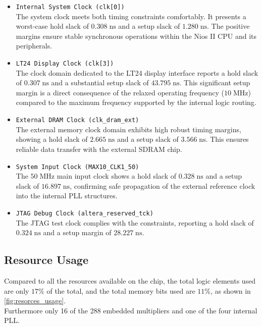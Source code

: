 \begin{itemize}
    \item \texttt{Internal System Clock (clk[0])} \\
    The system clock meets both timing constraints comfortably. It presents a worst-case hold slack of $0.308 \; \text{ns}$ and a setup slack of $1.280 \; \text{ns}$. The positive margins ensure stable synchronous operations within the Nios II CPU and its peripherals.

    \item \texttt{LT24 Display Clock (clk[3])} \\
    The clock domain dedicated to the LT24 display interface reports a hold slack of $0.307 \; \text{ns}$ and a substantial setup slack of $43.795 \; \text{ns}$. This significant setup margin is a direct consequence of the relaxed operating frequency ($10 \; \text{MHz}$) compared to the maximum frequency supported by the internal logic routing.

    \item \texttt{External DRAM Clock (clk\_dram\_ext)} \\
    The external memory clock domain exhibits high robust timing margins, showing a hold slack of $2.665 \; \text{ns}$ and a setup slack of $3.566 \; \text{ns}$. This ensures reliable data transfer with the external SDRAM chip.

    \item \texttt{System Input Clock (MAX10\_CLK1\_50)} \\
    The $50 \; \text{MHz}$ main input clock shows a hold slack of $0.328 \; \text{ns}$ and a setup slack of $16.897 \; \text{ns}$, confirming safe propagation of the external reference clock into the internal PLL structures.

    \item \texttt{JTAG Debug Clock (altera\_reserved\_tck)} \\
    The JTAG test clock complies with the constraints, reporting a hold slack of $0.324 \; \text{ns}$ and a setup margin of $28.227 \; \text{ns}$.
\end{itemize}

\newpage
\subsection{Resource Usage}
\label{sssec:hw_footprint_chpl}

Compared to all the resources available on the chip, the total logic elements used are only \(17\%\) of the total, and the total memory bits used are \(11\%\), as shown in \autoref{fig:resorces_usage}. \\
Furthermore only 16 of the 288 embedded multipliers and one of the four internal PLL.

